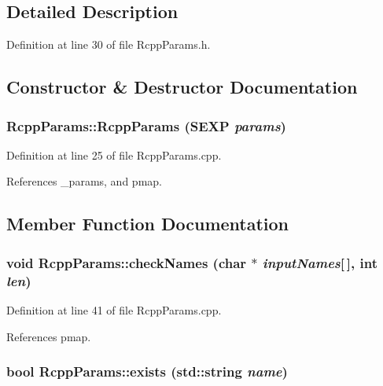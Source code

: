 \subsection{Detailed Description}


Definition at line 30 of file RcppParams.h.

\subsection{Constructor \& Destructor Documentation}
\hypertarget{classRcppParams_a7315d083ee0d1d0ca00c3aad0175d524}{
\subsubsection[{RcppParams}]{\setlength{\rightskip}{0pt plus 5cm}RcppParams::RcppParams (SEXP {\em params})}}
\label{classRcppParams_a7315d083ee0d1d0ca00c3aad0175d524}


Definition at line 25 of file RcppParams.cpp.

References \_\-params, and pmap.

\subsection{Member Function Documentation}
\hypertarget{classRcppParams_a1b8feaf39d3ffdf0f6773c44ac53736c}{
\subsubsection[{checkNames}]{\setlength{\rightskip}{0pt plus 5cm}void RcppParams::checkNames (char $\ast$ {\em inputNames}\mbox{[}$\,$\mbox{]}, \/  int {\em len})}}
\label{classRcppParams_a1b8feaf39d3ffdf0f6773c44ac53736c}


Definition at line 41 of file RcppParams.cpp.

References pmap.\hypertarget{classRcppParams_a989141ab2a8800b97d91bfb43420c6bc}{
\subsubsection[{exists}]{\setlength{\rightskip}{0pt plus 5cm}bool RcppParams::exists (std::string {\em name})}}
\label{classRcppParams_a989141ab2a8800b97d91bfb43420c6bc}


